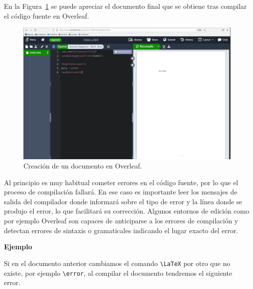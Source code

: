 \documentclass[
  letterpaper,
  DIV=11,
  numbers=noendperiod]{scrreport}
\begin{document}
En la Figura~\ref{fig-overleaf-hola-latex} se puede apreciar el
documento final que se obtiene tras compilar el código fuente en
Overleaf.

\begin{figure}

{\centering \includegraphics{./img/introduccion/overleaf-hola-latex.png}

}

\caption{\label{fig-overleaf-hola-latex}Creación de un documento en
Overleaf.}

\end{figure}

Al principio es muy habitual cometer errores en el código fuente, por lo
que el proceso de compilación fallará. En ese caso es importante leer
los mensajes de salida del compilador donde informará sobre el tipo de
error y la línea donde se produjo el error, lo que facilitará su
corrección. Algunos entornos de edición como por ejemplo Overleaf son
capaces de anticiparse a los errores de compilación y detectan errores
de sintaxis o gramaticales indicando el lugar exacto del error.

\textbf{Ejemplo}

Si en el documento anterior cambiamos el comando
\texttt{\textbackslash{}LaTeX} por otro que no existe, por ejemplo
\texttt{\textbackslash{}error}, al compilar el documento tendremos el
siguiente error.
\end{document}
